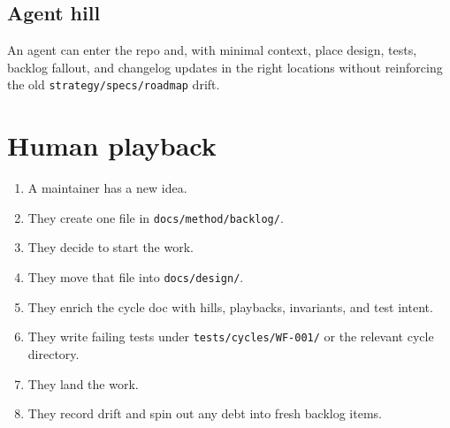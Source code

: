 \subsection{Agent hill}\label{record-200-agent-hill}

An agent can enter the repo and, with minimal context, place design, tests, backlog fallout, and changelog updates in the right locations without reinforcing the old \texttt{s\allowbreak{}t\allowbreak{}r\allowbreak{}a\allowbreak{}t\allowbreak{}e\allowbreak{}g\allowbreak{}y\allowbreak{}/\allowbreak{}s\allowbreak{}p\allowbreak{}e\allowbreak{}c\allowbreak{}s\allowbreak{}/\allowbreak{}r\allowbreak{}o\allowbreak{}a\allowbreak{}d\allowbreak{}m\allowbreak{}a\allowbreak{}p} drift.

\section{Human playback}\label{record-200-human-playback}

\begin{enumerate}
\def\labelenumi{\arabic{enumi}.}
\tightlist
\item
  A maintainer has a new idea.
\item
  They create one file in \texttt{d\allowbreak{}o\allowbreak{}c\allowbreak{}s\allowbreak{}/\allowbreak{}m\allowbreak{}e\allowbreak{}t\allowbreak{}h\allowbreak{}o\allowbreak{}d\allowbreak{}/\allowbreak{}b\allowbreak{}a\allowbreak{}c\allowbreak{}k\allowbreak{}l\allowbreak{}o\allowbreak{}g\allowbreak{}/}.
\item
  They decide to start the work.
\item
  They move that file into \texttt{d\allowbreak{}o\allowbreak{}c\allowbreak{}s\allowbreak{}/\allowbreak{}d\allowbreak{}e\allowbreak{}s\allowbreak{}i\allowbreak{}g\allowbreak{}n\allowbreak{}/}.
\item
  They enrich the cycle doc with hills, playbacks, invariants, and test intent.
\item
  They write failing tests under \texttt{t\allowbreak{}e\allowbreak{}s\allowbreak{}t\allowbreak{}s\allowbreak{}/\allowbreak{}c\allowbreak{}y\allowbreak{}c\allowbreak{}l\allowbreak{}e\allowbreak{}s\allowbreak{}/\allowbreak{}W\allowbreak{}F\allowbreak{}-\allowbreak{}0\allowbreak{}0\allowbreak{}1\allowbreak{}/} or the relevant cycle directory.
\item
  They land the work.
\item
  They record drift and spin out any debt into fresh backlog items.
\end{enumerate}

